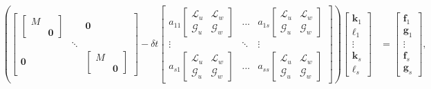 \documentclass[review]{siamart}
\begin{document}
{\small
\begin{align}\label{eq:daestage_lin}
\left( \begin{bmatrix} \begin{bmatrix} M \\ & \mathbf{0}\end{bmatrix} & &
	\mathbf{0} \\ & \ddots \\ \mathbf{0} & & \begin{bmatrix} M \\ & \mathbf{0}\end{bmatrix}
		\end{bmatrix}
	- \delta t \begin{bmatrix}
		a_{11}\begin{bmatrix} \mathcal{L}_{u} & \mathcal{L}_{w} \\
			\mathcal{G}_{u} & \mathcal{G}_w \end{bmatrix} & ... & a_{1s}
		\begin{bmatrix} \mathcal{L}_{u} & \mathcal{L}_{w} \\ \mathcal{G}_{u} & \mathcal{G}_w
		\end{bmatrix} \\
		\vdots & \ddots & \vdots \\
		a_{s1}\begin{bmatrix} \mathcal{L}_{u} & \mathcal{L}_{w} \\
			\mathcal{G}_{u} & \mathcal{G}_w \end{bmatrix}
		& ... & a_{ss} \begin{bmatrix} \mathcal{L}_{u} & \mathcal{L}_{w} \\
			\mathcal{G}_{u} & \mathcal{G}_w \end{bmatrix}
	\end{bmatrix} \right)
	\begin{bmatrix} \mathbf{k}_1 \\ \boldsymbol{\ell}_1 \\ \vdots \\
		\mathbf{k}_s \\ \boldsymbol{\ell}_s\end{bmatrix} 
& = \begin{bmatrix} \mathbf{f}_1 \\ \mathbf{g}_1 \\ \vdots \\
	\mathbf{f}_s \\ \mathbf{g}_s \end{bmatrix},
\end{align}
}
\end{document}
